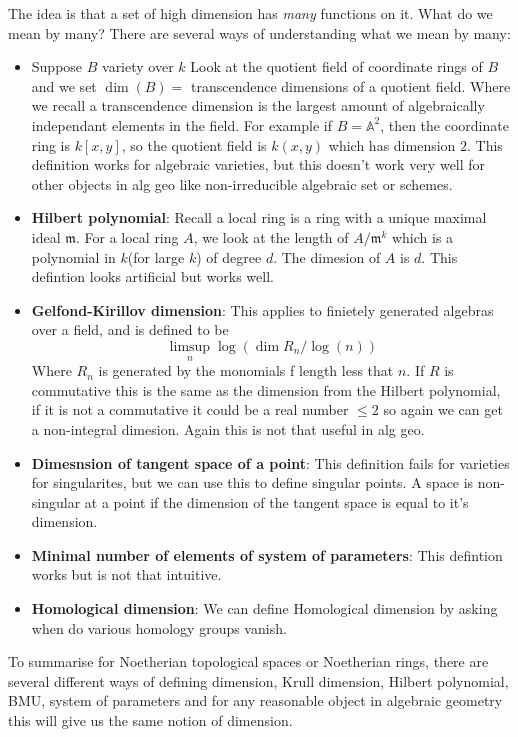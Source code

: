 The idea is that a set of high dimension has \textit{many} functions on it. What do we mean by many? There are several ways of understanding what we mean by many:
\begin{definition}
\begin{itemize}
    \item Suppose $B$ variety over $k$ Look at the quotient field of coordinate rings of $B$ and we set $\dim (B) = $ transcendence dimensions of a quotient field. Where we recall a transcendence dimension is the largest amount of algebraically independant elements in the field. For example if $B = \mathbb{A}^2$, then the coordinate ring is $k[x,y]$, so the quotient field is $k(x,y)$ which has dimension $2$. This definition works for algebraic varieties, but this doesn't work very well for other objects in alg geo like non-irreducible algebraic set or schemes.
    \item \textbf{Hilbert polynomial}: Recall a local ring is a ring with a unique maximal ideal $\mathfrak{m}$. For a local ring $A$, we look at the length of $A/\mathfrak{m}^k$ which is a polynomial in $k$(for large $k$) of degree $d$. The dimesion of $A$ is $d$. This defintion looks artificial but works well.
    \item \textbf{Gelfond-Kirillov dimension}: This applies to finietely generated algebras over a field, and is defined to be \[\limsup_n \log(\dim R_n/\log(n))\] Where $R_n$ is generated by the monomials f length less that $n$. If $R$ is commutative this is the same as the dimension from the Hilbert polynomial, if it is not a commutative it could be a real number $\leq 2$ so again we can get a non-integral dimesion. Again this is not that useful in alg geo.
    \item \textbf{Dimesnsion of tangent space of a point}: This definition fails for varieties for singularites, but we can use this to define singular points. A space is non-singular at a point if the dimension of the tangent space is equal to it's dimension.
    \item \textbf{Minimal number of elements of system of parameters}: This defintion works but is not that intuitive.
    \item \textbf{Homological dimension}: We can define Homological dimension by asking when do various homology groups vanish. 
\end{itemize}
\end{definition}

To summarise for Noetherian topological spaces or Noetherian rings, there are several different ways of defining dimension, Krull dimension, Hilbert polynomial, BMU, system of parameters and for any reasonable object in algebraic geometry this will give us the same notion of dimension.

